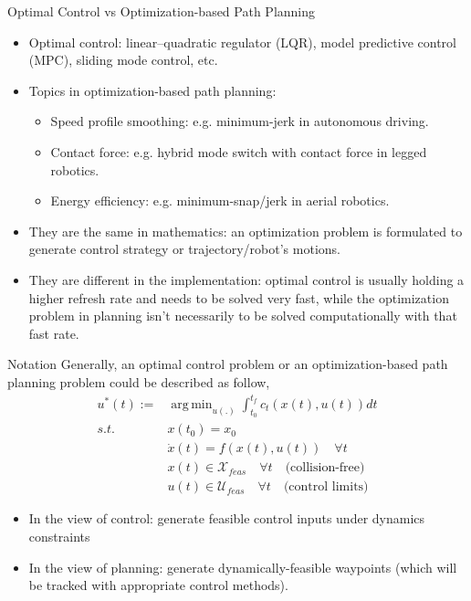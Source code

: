 \documentclass{beamer}
\DeclareMathOperator*{\argmin}{arg\,min}
\begin{document}
\begin{frame}{Optimal Control vs Optimization-based Path Planning}
	\begin{itemize}
		\item Optimal control: linear–quadratic regulator (LQR), model predictive control (MPC), sliding mode control, etc.
		\item Topics in optimization-based path planning:
		\begin{itemize}
			\item Speed profile smoothing: e.g. minimum-jerk in autonomous driving.
			\item Contact force: e.g. hybrid mode switch with contact force in legged robotics.
			\item Energy efficiency: e.g. minimum-snap/jerk in aerial robotics.
		\end{itemize} 
		\item They are the same in mathematics: an optimization problem is formulated to generate control strategy or trajectory/robot's motions.
		\item They are different in the implementation: optimal control is usually holding a higher refresh rate and needs to be solved very fast, while the  optimization problem in planning isn't necessarily to be solved computationally with that fast rate.
	\end{itemize}
\end{frame}

\begin{frame}{Notation}
	Generally, an optimal control problem or an optimization-based path planning problem could be described as follow,
	\begin{align*}
		u^*(t) :=& \argmin_{u(.)} \int_{t_0}^{t_f} c_t (x(t), u(t)) dt \\
		\textit{s.t.} \ & x(t_0) = x_0 \\
		& \dot{x}(t) = f(x(t), u(t)) \quad \forall t \\
		& x(t) \in \mathcal{X}_{feas} \quad \forall t \quad \text{(collision-free)} \\
		& u(t) \in \mathcal{U}_{feas} \quad \forall t \quad \text{(control limits)}
	\end{align*}
	\begin{itemize}
		\item In the view of control: generate feasible control inputs under dynamics constraints
		\item In the view of planning: generate dynamically-feasible waypoints (which will be tracked with appropriate control methods).
	\end{itemize}
\end{frame}
\end{document}
